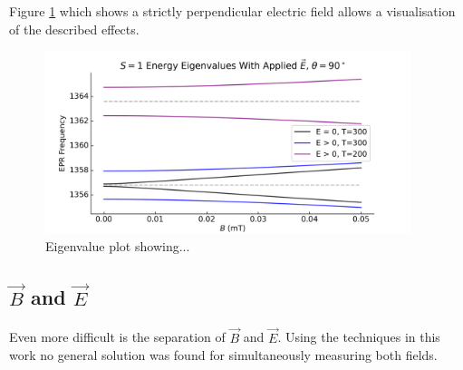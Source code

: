 Figure \ref{fig:E_Field_perp_temp} which shows a strictly perpendicular electric field allows a visualisation of the described effects.  
\begin{figure}[H]
    \begin{center}
        \includegraphics[width=0.95\textwidth]{figures/EFieldPerpTemp.png}
    \end{center}
    \caption{Eigenvalue plot showing... }\label{fig:E_Field_perp_temp}
\end{figure}


\subsection{$\vec{B}$ and $\vec{E}$}
Even more difficult is the separation of $\vec{B}$ and $\vec{E}$. Using the techniques in this work no general solution was found for simultaneously measuring both fields. 
%
%
%
%
%





